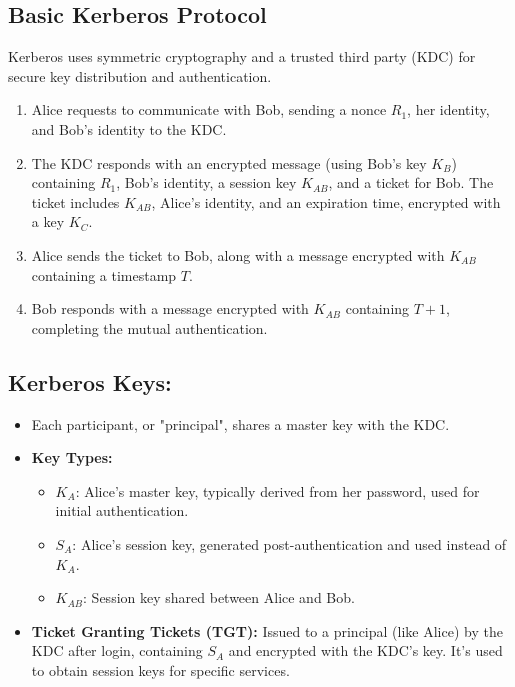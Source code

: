\documentclass[12pt]{article}
\begin{document}
\subsection*{Basic Kerberos Protocol}
Kerberos uses symmetric cryptography and a trusted third party (KDC) for secure key distribution and authentication.
\begin{enumerate}
    \item Alice requests to communicate with Bob, sending a nonce \( R_1 \), her identity, and Bob's identity to the KDC.
    \item The KDC responds with an encrypted message (using Bob's key \( K_B \)) containing \( R_1 \), Bob's identity, a session key \( K_{AB} \), and a ticket for Bob. The ticket includes \( K_{AB} \), Alice's identity, and an expiration time, encrypted with a key \( K_C \).
    \item Alice sends the ticket to Bob, along with a message encrypted with \( K_{AB} \) containing a timestamp \( T \).
    \item Bob responds with a message encrypted with \( K_{AB} \) containing \( T+1 \), completing the mutual authentication.
\end{enumerate}

\subsection*{Kerberos Keys:}
\begin{itemize}
    \item Each participant, or "principal", shares a master key with the KDC.
    \item \textbf{Key Types:}
    \begin{itemize}
        \item \( K_A \): Alice's master key, typically derived from her password, used for initial authentication.
        \item \( S_A \): Alice's session key, generated post-authentication and used instead of \( K_A \).
        \item \( K_{AB} \): Session key shared between Alice and Bob.
    \end{itemize}
    \item \textbf{Ticket Granting Tickets (TGT):} Issued to a principal (like Alice) by the KDC after login, containing \( S_A \) and encrypted with the KDC's key. It's used to obtain session keys for specific services.
\end{itemize}
\end{document}
